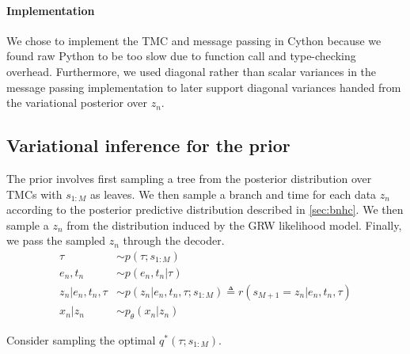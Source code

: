 \paragraph{Implementation} We chose
to implement the TMC and message
passing in Cython because we found raw Python to be
too slow due to function call and type-checking
overhead. Furthermore, we used diagonal rather than
scalar variances in the message passing implementation
to later support diagonal variances handed 
from the variational posterior over $z_n$.

\subsection{Variational inference for the \acronym\;prior}
\label{sec:inference-details}

The \acronym\; prior involves first sampling a tree
from the posterior distribution over TMCs
with $s_{1:M}$ as leaves.
We then sample a branch and time
for each data $z_n$ according
to the posterior predictive
distribution described in \autoref{sec:bnhc}.
We then sample a $z_n$ from
the distribution induced by the GRW likelihood model.
Finally, we pass the sampled $z_n$
through the decoder.
\begin{equation}
    \begin{split}
        \tau &\sim p(\tau ; s_{1:M}) \\
        e_n, t_n &\sim p(e_n, t_n | \tau) \\
        z_n | e_n, t_n, \tau &\sim p(z_n | e_n, t_n, \tau; s_{1:M}) \triangleq r(s_{M + 1} = z_n | e_n, t_n, \tau) \\
        x_n | z_n &\sim p_\theta(x_n | z_n)
    \end{split}
\end{equation}

Consider sampling the optimal $q^*(\tau; s_{1:M})$.

